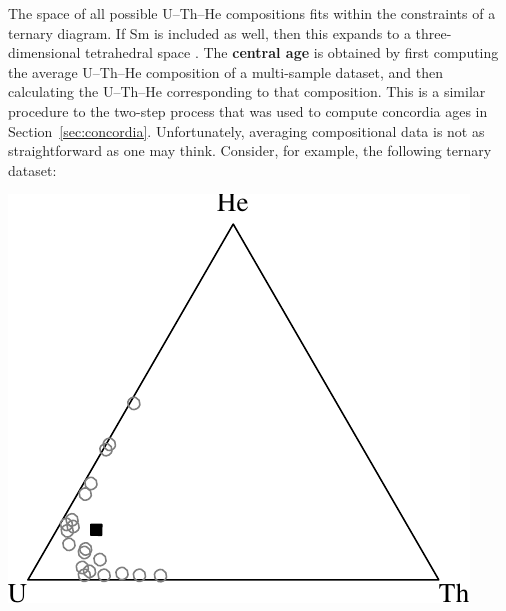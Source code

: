 \begin{refsection}
The space of all possible U--Th--He compositions fits within the
constraints of a ternary diagram. If Sm is included as well, then this
expands to a three-dimensional tetrahedral space
\citep{vermeesch2008a}. The \textbf{central age} is obtained by first
computing the average U--Th--He composition of a multi-sample dataset,
and then calculating the U--Th--He corresponding to that composition.
This is a similar procedure to the two-step process that was used to
compute concordia ages in Section~\ref{sec:concordia}.  Unfortunately,
averaging compositional data is not as straightforward as one may
think. Consider, for example, the following ternary dataset:\\

\noindent\begin{minipage}[t]{.4\linewidth}
\strut\vspace*{-\baselineskip}\newline
\includegraphics[width=\textwidth]{../figures/ternaryhelium.pdf}\\
\end{minipage}
\begin{minipage}[t]{.6\linewidth}
  \label{fig:ternaryhelium}
\end{minipage}


\end{refsection}
